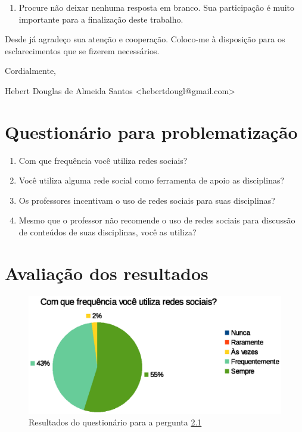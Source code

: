 \begin{apendicesenv}
\begin{enumerate}
\item Procure não deixar nenhuma resposta em branco. Sua participação é muito importante para a finalização deste trabalho.
\end{enumerate}

Desde já agradeço sua atenção e cooperação. Coloco-me à disposição para os esclarecimentos que se fizerem necessários.

Cordialmente,
\begin{description}
\item Hebert Douglas de Almeida Santos <hebertdougl@gmail.com>
\end{description}

\chapter{Questionário para problematização}
\label{apen-quest}

\begin{enumerate}

\item \label{pergunta1} Com que frequência você utiliza redes sociais?

\item \label{pergunta2} Você utiliza alguma rede social como ferramenta de apoio as disciplinas?

\item \label{pergunta3} Os professores incentivam o uso de redes sociais para suas disciplinas?

\item \label{pergunta4} Mesmo que o professor não recomende o uso de redes sociais para discussão de conteúdos de suas disciplinas, você as utiliza?

\end{enumerate}


\chapter{Avaliação dos resultados}
\label{apen-quest-result}

\begin{figure}[h]
    \centering
    \includegraphics[keepaspectratio=true,scale=1]
      {figuras/pergunta1p.eps}
    \caption{Resultados do questionário para a pergunta \ref{pergunta1}}
    \label{pergunta1}
\end{figure}


\end{apendicesenv}
